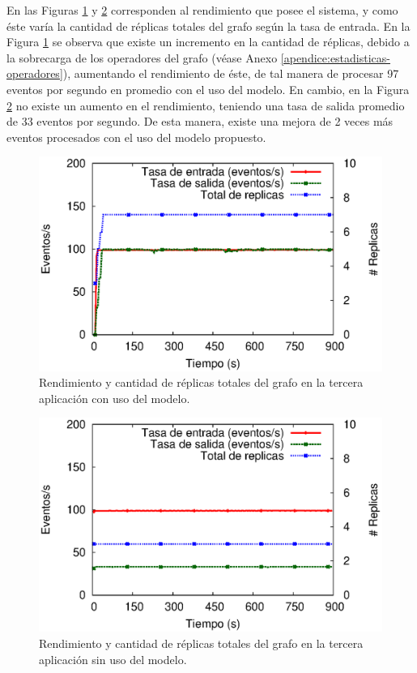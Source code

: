 En las Figuras \ref{fig:app3-processSystem-cm} y \ref{fig:app3-processSystem-sm} \normalsize{corresponden al rendimiento que posee el sistema, y como \'este var\'ia la cantidad de r\'eplicas totales del grafo seg\'un la tasa de entrada.} En la Figura \ref{fig:app3-processSystem-cm} \normalsize{se observa que existe un incremento en la cantidad de r\'eplicas, debido a la sobrecarga de los operadores del grafo} (v\'ease Anexo \ref{apendice:estadisticas-operadores}), \normalsize{aumentando el rendimiento de \'este, de tal manera de procesar 97 eventos por segundo en promedio con el uso del modelo. En cambio, en la Figura} \ref{fig:app3-processSystem-sm} \normalsize{no existe un aumento en el rendimiento, teniendo una tasa de salida promedio de 33 eventos por segundo. De esta manera, existe una mejora de 2 veces m\'as eventos procesados con el uso del modelo propuesto.}

\begin{figure}[!ht]
	\centering
	\includegraphics[scale=0.7]{images/exp/app3/cm/logical/processSystem.eps}
    \caption{Rendimiento y cantidad de r\'eplicas totales del grafo en la tercera aplicaci\'on con uso del modelo.}
	\label{fig:app3-processSystem-cm}
\end{figure}

\begin{figure}[!ht]
	\centering
	\includegraphics[scale=0.7]{images/exp/app3/sm/logical/processSystem.eps}
    \caption{Rendimiento y cantidad de r\'eplicas totales del grafo en la tercera aplicaci\'on sin uso del modelo.}
	\label{fig:app3-processSystem-sm}
\end{figure}

